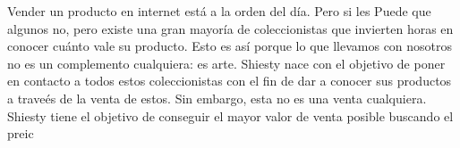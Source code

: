 
	Vender un producto en internet está a la orden del día. Pero si les  Puede que algunos no, pero existe una gran mayoría de coleccionistas que invierten horas en conocer cuánto vale su producto. Esto es así porque lo que llevamos con nosotros no es un complemento cualquiera: es arte. 
	Shiesty nace con el objetivo de poner en contacto a todos estos coleccionistas con el fin de dar a conocer sus productos a traveés de la venta de estos. Sin embargo, esta no es una venta cualquiera. Shiesty tiene el objetivo de conseguir el mayor valor de venta posible buscando el preic
